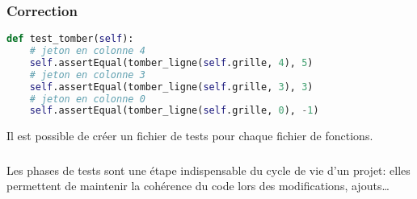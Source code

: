 \documentclass[svgnames,11pt]{beamer}
\begin{document}
\begin{frame}[fragile]
    \frametitle{Correction}

\begin{center}
\begin{lstlisting}[language=Python , basicstyle=\ttfamily\small, xleftmargin=.5em, xrightmargin=-1em]
def test_tomber(self):
    # jeton en colonne 4
    self.assertEqual(tomber_ligne(self.grille, 4), 5)
    # jeton en colonne 3
    self.assertEqual(tomber_ligne(self.grille, 3), 3)
    # jeton en colonne 0
    self.assertEqual(tomber_ligne(self.grille, 0), -1)
\end{lstlisting}
\end{center}   
\begin{aretenir}[Remarque]
Il est possible de créer un fichier de tests pour chaque fichier de fonctions.
\end{aretenir}
\end{frame}
\begin{frame}
    \frametitle{}

\begin{aretenir}[]
Les phases de tests sont une étape indispensable du cycle de vie d'un projet: elles permettent de maintenir la cohérence du code lors des modifications, ajouts\dots
\end{aretenir}   

\end{frame}
\end{document}
